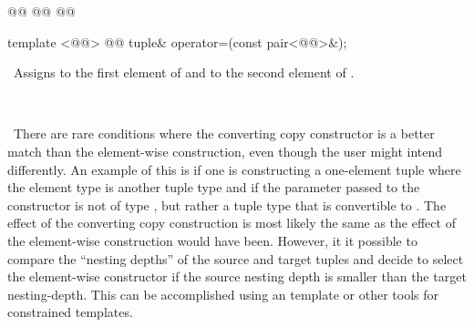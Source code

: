 \documentclass[american,twoside]{book}
\begin{document}
%
%
\begin{itemdecl}
@@
  @@ 
  @@
\end{itemdecl}

\begin{itemdescr}
\pnum
{}

\pnum
{}

\pnum
{}
\end{itemdescr}

%
%
%
\begin{itemdecl}
template <@@>
  @@
  tuple& operator=(const pair<@@>&);
\end{itemdecl}

\begin{itemdescr}
\pnum
{}

\pnum
\effects\  Assigns  to the first element of 
and  to the second element of .

\pnum
\returns\  

\pnum
\enternote\ There are rare conditions where the
  converting copy constructor is a better match than the element-wise
  construction, even though the user might intend differently.  An
  example of this is if one is constructing a one-element tuple where
  the element type is another tuple type  and if the parameter
  passed to the constructor is not of type , but rather a tuple
  type that is convertible to .  The effect of the converting copy
  construction is most likely the same as the effect of the
  element-wise construction would have been.  However, it it possible
  to compare the ``nesting depths'' of the source and target tuples and
  decide to select the element-wise constructor if the source nesting
  depth is smaller than the target nesting-depth.  This can be
  accomplished using an  template or other tools for
  constrained templates.  
\exitnote\
\end{itemdescr}
\end{document}
